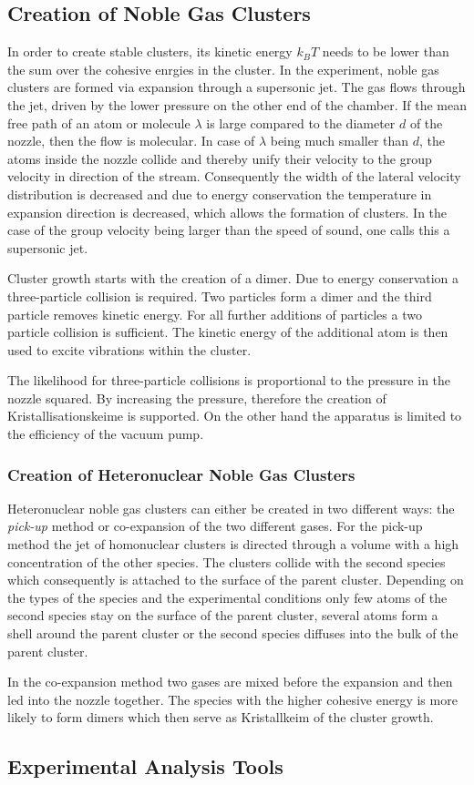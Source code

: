 \subsection{Creation of Noble Gas Clusters}
In order to create stable clusters, its kinetic energy $k_BT$ needs to be lower
than the sum over the cohesive enrgies in the cluster.
In the experiment, noble gas clusters are formed via expansion through
a supersonic jet. The gas flows through the jet, driven by the lower pressure
on the other end of the chamber. If the mean free path of an atom or molecule
$\lambda$ is large compared to the diameter $d$ of the nozzle, then the flow is
molecular. In case of $\lambda$ being much smaller than $d$, the atoms inside
the nozzle collide and thereby unify their velocity to the group velocity
in direction of the stream. Consequently the width of the lateral velocity
distribution is decreased and due to energy conservation the temperature
in expansion direction is decreased, which allows the formation of clusters.
In the case of the group velocity being larger than the speed of sound,
one calls this a supersonic jet.

Cluster growth starts with the creation of a dimer. Due to energy conservation
a three-particle collision is required. Two particles form a dimer and the
third particle removes kinetic energy. For all further additions of particles
a two particle collision is sufficient. The kinetic energy of the additional
atom is then used to excite vibrations within the cluster.

The likelihood for three-particle collisions is proportional to the pressure
in the nozzle squared. By increasing the pressure, therefore the creation
of Kristallisationskeime is supported. On the other hand the apparatus
is limited to the efficiency of the vacuum pump.

\subsubsection{Creation of Heteronuclear Noble Gas Clusters}
Heteronuclear noble gas clusters can either be created in two different ways:
the \emph{pick-up} method or co-expansion of the two different gases.
For the pick-up method the jet of homonuclear clusters is directed through
a volume with a high concentration of the other species. The clusters
collide with the second species which consequently is attached to the surface
of the parent cluster. Depending on the types of the species
and the experimental conditions only few atoms
of the second species stay on the surface of the parent cluster,
several atoms form a shell around the parent cluster or the second species
diffuses into the bulk of the parent cluster.

In the co-expansion method two gases are mixed before the expansion and
then led into the nozzle together. The species with the higher cohesive
energy is more likely to form dimers which then serve as Kristallkeim of
the cluster growth.



\subsection{Experimental Analysis Tools}

